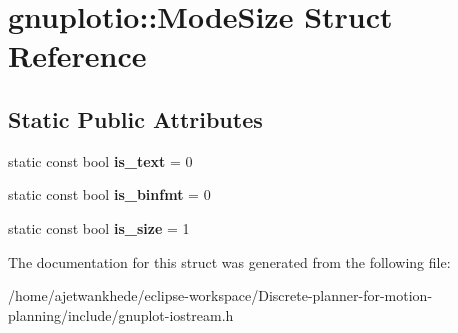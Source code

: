 \hypertarget{structgnuplotio_1_1ModeSize}{}\section{gnuplotio\+:\+:Mode\+Size Struct Reference}
\label{structgnuplotio_1_1ModeSize}
\subsection*{Static Public Attributes}
\begin{DoxyCompactItemize}
\item 
\mbox{\label{structgnuplotio_1_1ModeSize_aa01840f76877ae7c8bad254dae28e32c}} 
static const bool {\bfseries is\+\_\+text} = 0
\item 
\mbox{\label{structgnuplotio_1_1ModeSize_ac5243e8e4910f2f6a2724b9fc0de4ff9}} 
static const bool {\bfseries is\+\_\+binfmt} = 0
\item 
\mbox{\label{structgnuplotio_1_1ModeSize_aa20ae9f1ce222504489db33d13eb46c0}} 
static const bool {\bfseries is\+\_\+size} = 1
\end{DoxyCompactItemize}


The documentation for this struct was generated from the following file\+:\begin{DoxyCompactItemize}
\item 
/home/ajetwankhede/eclipse-\/workspace/\+Discrete-\/planner-\/for-\/motion-\/planning/include/gnuplot-\/iostream.\+h\end{DoxyCompactItemize}
